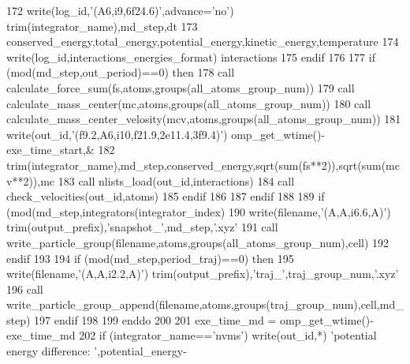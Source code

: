 \begin{DoxyCode}
172             \textcolor{keyword}{write}(log\_id,\textcolor{stringliteral}{'(A6,i9,6f24.6)'},advance=\textcolor{stringliteral}{'no'}) trim(integrator\_name),md\_step,dt%
173             conserved\_energy,total\_energy,potential\_energy,kinetic\_energy,temperature
174             \textcolor{keyword}{write}(log\_id,interactions\_energies\_format) interactions%
175 \textcolor{keywordflow}{        endif}
176         
177         \textcolor{keywordflow}{if} (mod(md\_step,out\_period)==0) \textcolor{keywordflow}{then}
178             \textcolor{keyword}{call }calculate\_force\_sum(fs,atoms,groups(all\_atoms\_group\_num))
179             \textcolor{keyword}{call }calculate\_mass\_center(mc,atoms,groups(all\_atoms\_group\_num))
180             \textcolor{keyword}{call }calculate\_mass\_center\_velosity(mcv,atoms,groups(all\_atoms\_group\_num))
181             \textcolor{keyword}{write}(out\_id,\textcolor{stringliteral}{'(f9.2,A6,i10,f21.9,2e11.4,3f9.4)'}) omp\_get\_wtime()-exe\_time\_start,&
182             trim(integrator\_name),md\_step,conserved\_energy,sqrt(sum(fs**2)),sqrt(sum(mcv**2)),mc
183             \textcolor{keyword}{call }nlists\_load(out\_id,interactions)
184             \textcolor{keyword}{call }check\_velocities(out\_id,atoms)
185 \textcolor{keywordflow}{        endif}
186         
187 \textcolor{keywordflow}{    endif}
188 
189     \textcolor{keywordflow}{if} (mod(md\_step,integrators(integrator\_index)%
190         \textcolor{keyword}{write}(filename,\textcolor{stringliteral}{'(A,A,i6.6,A)'}) trim(output\_prefix),\textcolor{stringliteral}{'snapshot\_'},md\_step,\textcolor{stringliteral}{'.xyz'}
191         \textcolor{keyword}{call }write\_particle\_group(filename,atoms,groups(all\_atoms\_group\_num),cell)
192 \textcolor{keywordflow}{    endif}
193 
194     \textcolor{keywordflow}{if} (mod(md\_step,period\_traj)==0) \textcolor{keywordflow}{then}
195         \textcolor{keyword}{write}(filename,\textcolor{stringliteral}{'(A,A,i2.2,A)'}) trim(output\_prefix),\textcolor{stringliteral}{'traj\_'},traj\_group\_num,\textcolor{stringliteral}{'.xyz'}
196         \textcolor{keyword}{call }write\_particle\_group\_append(filename,atoms,groups(traj\_group\_num),cell,md\_step)
197 \textcolor{keywordflow}{    endif}
198     
199 \textcolor{keywordflow}{enddo}
200 
201 exe\_time\_md = omp\_get\_wtime()-exe\_time\_md 
202 \textcolor{keywordflow}{if} (integrator\_name==\textcolor{stringliteral}{'nvms'}) \textcolor{keyword}{write}(out\_id,*) \textcolor{stringliteral}{'potential energy difference: '},potential\_energy-

\end{DoxyCode}
